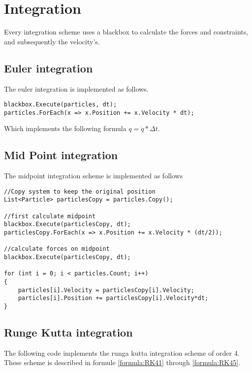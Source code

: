 \chapter{Integration} 
Every integration scheme uses a blackbox to calculate the forces and constraints, and subsequently the velocity's.

\section{Euler integration}
The euler integration is implemented as follows.
\begin{lstlisting}
blackbox.Execute(particles, dt);
particles.ForEach(x => x.Position += x.Velocity * dt);
\end{lstlisting}
Which implements the following formula $q = \dot{q}*\Delta t$.

\section{Mid Point integration}
The midpoint integration scheme is implemented as follows

\begin{lstlisting}
//Copy system to keep the original position
List<Particle> particlesCopy = particles.Copy();

//first calculate midpoint
blackbox.Execute(particlesCopy, dt);
particlesCopy.ForEach(x => x.Position += x.Velocity * (dt/2));

//calculate forces on midpoint
blackbox.Execute(particlesCopy, dt);

for (int i = 0; i < particles.Count; i++)
{
	particles[i].Velocity = particlesCopy[i].Velocity;
	particles[i].Position += particlesCopy[i].Velocity*dt;
}
\end{lstlisting}

\section{Runge Kutta integration}
The following code implements the runga kutta integration scheme of order 4. These scheme is described in formule \ref{formula:RK41} through \ref{formula:RK45}.

